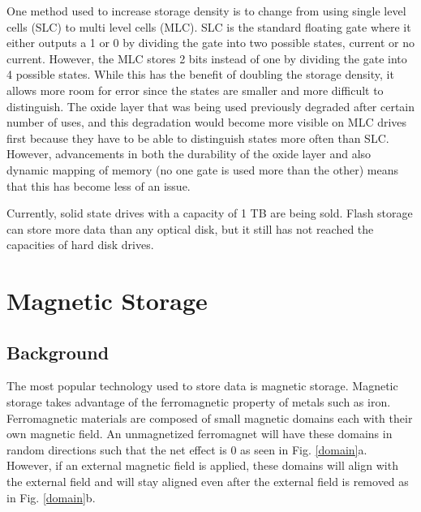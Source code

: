 \documentclass[ notitlepage, numerical, 11pt]{revtex4-1} %
\begin{document}
One method used to increase storage density is to change from using single level cells (SLC) to multi level cells (MLC). SLC is the standard floating gate where it either outputs a 1 or 0 by dividing the gate into two possible states, current or no current. However, the MLC stores 2 bits instead of one by dividing the gate into 4 possible states. While this has the benefit of doubling the storage density, it allows more room for error since the states are smaller and more difficult to distinguish. The oxide layer that was being used previously degraded after certain number of uses, and this degradation would become more visible on MLC drives first because they have to be able to distinguish states more often than SLC. However, advancements in both the durability of the oxide layer and also dynamic mapping of memory (no one gate is used more than the other) means that this has become less of an issue. 

Currently, solid state drives with a capacity of 1 TB are being sold. Flash storage can store more data than any optical disk, but it still has not reached the capacities of hard disk drives.


\section{Magnetic Storage}
\subsection{Background}
The most popular technology used to store data is magnetic storage. Magnetic storage takes advantage of the ferromagnetic property of metals such as iron. Ferromagnetic materials are composed of small magnetic domains each with their own magnetic field. An unmagnetized ferromagnet will have these domains in random directions such that the net effect is 0 as seen in Fig. \ref{domain}a. However, if an external magnetic field is applied, these domains will align with the external field and will stay aligned even after the external field is removed as in Fig. \ref{domain}b.
\end{document}
